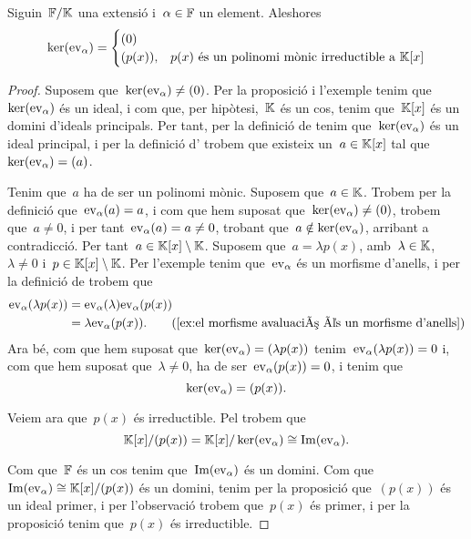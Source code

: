 \documentclass[../Apunts.tex]{subfiles}
\begin{document}
	\begin{lemma}
		Siguin~\(\mathbb{F}/\mathbb{K}\) una extensió i~\(\alpha\in\mathbb{F}\) un element. Aleshores
		\[\operatorname{ker}(\mathrm{ev}_{\alpha})=\begin{cases}
			(0) \\
			(p(x)), & p(x)\text{ és un polinomi mònic irreductible a }\mathbb{K}[x]
		\end{cases}\]
		\begin{proof}
			Suposem que~\(\operatorname{ker}(\mathrm{ev}_{\alpha})\neq(0)\). Per la proposició  i l'exemple  tenim que~\(\operatorname{ker}(\mathrm{ev}_{\alpha})\) és un ideal, i com que, per hipòtesi,~\(\mathbb{K}\) és un cos, tenim que~\(\mathbb{K}[x]\) és un domini d'ideals principals. %
			Per tant, per la definició de  tenim que~\(\operatorname{ker}(\mathrm{ev}_{\alpha})\) és un ideal principal, i per la definició d' trobem que existeix un~\(a\in\mathbb{K}[x]\) tal que~\(\operatorname{ker}(\mathrm{ev}_{\alpha})=(a)\).
			
			Tenim que~\(a\) ha de ser un polinomi mònic. Suposem que~\(a\in\mathbb{K}\). Trobem per la definició  que~\(\mathrm{ev}_{\alpha}(a)=a\), i com que hem suposat que~\(\operatorname{ker}(\mathrm{ev}_{\alpha})\neq(0)\), trobem que~\(a\neq0\), i per tant~\(\mathrm{ev}_{\alpha}(a)=a\neq0\), trobant que~\(a\notin\operatorname{ker}(\mathrm{ev}_{\alpha})\), arribant a contradicció. Per tant~\(a\in\mathbb{K}[x]\setminus\mathbb{K}\). Suposem que~\(a=\lambda p(x)\), amb~\(\lambda\in\mathbb{K}\),~\(\lambda\neq0\) i~\(p\in\mathbb{K}[x]\setminus\mathbb{K}\). Per l'exemple  tenim que~\(\mathrm{ev}_{\alpha}\) és un morfisme d'anells, i per la definició de  trobem que
			\begin{align*}
				\ev_{\alpha}(\lambda p(x))&=\ev_{\alpha}(\lambda)\ev_{\alpha}(p(x))\\
				&=\lambda\ev_{\alpha}(p(x)). \tag{\ref{ex:el morfisme avaluació és un morfisme d'anells}}
			\end{align*}
			Ara bé, com que hem suposat que~\(\operatorname{ker}(\mathrm{ev}_{\alpha})=(\lambda p(x))\) tenim~\(\mathrm{ev}_{\alpha}(\lambda p(x))=0\) i, com que hem suposat que~\(\lambda\neq0\), ha de ser~\(\mathrm{ev}_{\alpha}(p(x))=0\), i tenim que
			\[\operatorname{ker}(\mathrm{ev}_{\alpha})=(p(x)).\]
			
			Veiem ara que~\(p(x)\) és irreductible. Pel  trobem que
			\[\mathbb{K}[x]/(p(x))=\mathbb{K}[x]/\operatorname{ker}(\mathrm{ev}_{\alpha})\cong\operatorname{Im}(\mathrm{ev}_{\alpha}).\]
			
			Com que~\(\mathbb{F}\) és un cos tenim que~\(\operatorname{Im}(\mathrm{ev}_{\alpha})\) és un domini. %
			Com que~\(\operatorname{Im}(\mathrm{ev}_{\alpha})\cong\mathbb{K}[x]/(p(x))\) és un domini, tenim per la proposició  que~\((p(x))\) és un ideal primer, i per l'observació  trobem que~\(p(x)\) és primer, i per la proposició  tenim que~\(p(x)\) és irreductible.
		\end{proof}
	\end{lemma}
\end{document}
